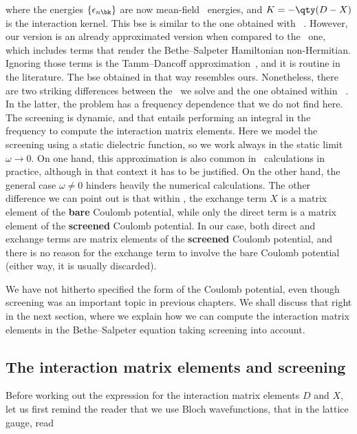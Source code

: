 \noindent where the energies $\{\epsilon_{n \bk}\}$ are now mean-field \qp~energies, and $K = -\qty(D - X)$ is the interaction kernel.
This \gls{bse} is similar to the one obtained with \mbpt~\cite{Jornada_PhD,Diana_PhD}.
However, our version is an already approximated version when compared to the \mbpt~one, which includes terms that render the Bethe--Salpeter Hamiltonian non-Hermitian.
Ignoring those terms is the Tamm--Dancoff approximation~\cite{Dreuw_2005,Hirata_1999}, and it is routine in the literature.
The \gls{bse} obtained in that way resembles ours.
Nonetheless, there are two striking differences between the \bse~we solve and the one obtained within \mbpt~\cite{Jornada_PhD,Diana_PhD}.
In the latter, the problem has a frequency dependence that we do not find here.
The screening is dynamic, and that entails performing an integral in the frequency to compute the interaction matrix elements.
Here we model the screening using a static dielectric function, so we work always in the static limit $\omega \to 0$.
On one hand, this approximation is also common in \abinit~calculations in practice, although in that context it has to be justified.
On the other hand, the general case $\omega \neq 0$ hinders heavily the numerical calculations.
The other difference we can point out is that within \mbpt, the exchange term $X$ is a matrix element of the \textbf{bare} Coulomb potential, while only the direct term is a matrix element of the \textbf{screened} Coulomb potential.
In our case, both direct and exchange terms are matrix elements of the \textbf{screened} Coulomb potential, and there is no reason for the exchange term to involve the bare Coulomb potential (either way, it is usually discarded).

We have not hitherto specified the form of the Coulomb potential, even though screening was an important topic in previous chapters.
We shall discuss that right in the next section, where we explain how we can compute the interaction matrix elements in the Bethe--Salpeter equation taking screening into account.


\subsection{The interaction matrix elements and screening}
\label{subsec:interaction_matrix_elements_and_screening}

Before working out the expression for the interaction matrix elements $D$ and $X$, let us first remind the reader that we use Bloch wavefunctions, that in the lattice gauge, read

